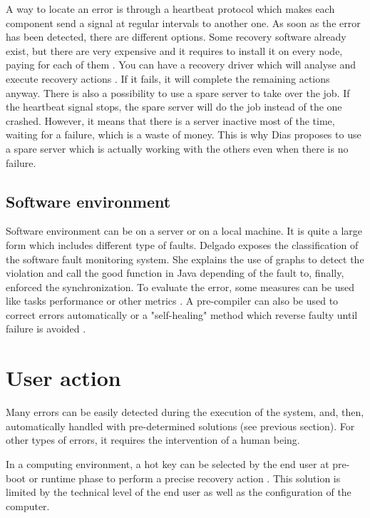 \documentclass[10pt,a4paper]{report}
\begin{document}
A way to locate an error is through a heartbeat protocol \cite{TecReview1,TecReview2} which makes each component send a signal at regular intervals to another one. As soon as the error has been detected, there are different options. 
Some recovery software already exist, but there are very expensive and it requires to install it on every node, paying for each of them \cite{TecReview1}.
You can have a recovery driver which will analyse and execute recovery actions \cite{TecReview1}. If it fails, it will complete the remaining actions anyway. 
There is also a possibility to use a spare server to take over the job. If the heartbeat signal stops, the spare server will do the job instead of the one crashed. However, it means that there is a server inactive most of the time, waiting for a failure, which is a waste of money. This is why Dias \cite{TecReview2} proposes to use a spare server which is actually working with the others even when there is no failure.

\subsection{Software environment}
Software environment can be on a server or on a local machine. It is quite a large form which includes different type of faults. Delgado \cite{TecReview3} exposes the classification of the software fault monitoring system. She explains the use of graphs to detect the violation and call the good function in Java depending of the fault to, finally, enforced the synchronization. To evaluate the error, some measures can be used like tasks performance or other metrics \cite{TecReview4}. A pre-compiler can also be used to correct errors automatically \cite{TecReview5} or a "self-healing" method which reverse faulty until failure is avoided \cite{TecReview6}.
		
\section{User action}	
Many errors can be easily detected during the execution of the system, and, then, automatically handled with pre-determined solutions (see previous section). For other types of errors, it requires the intervention of a human being. 

In a computing environment, a hot key can be selected by the end user at pre-boot or runtime phase to perform a precise recovery action \cite{TecReview7}. This solution is limited by the technical level of the end user as well as the configuration of the computer. 
\end{document}
